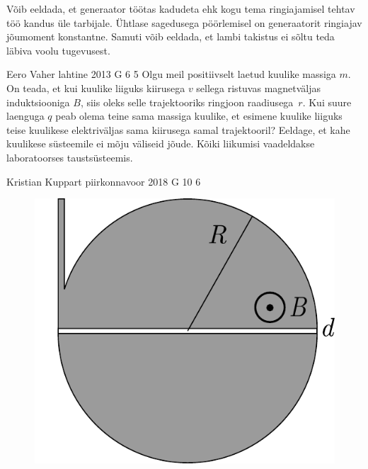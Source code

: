 \documentclass[11pt]{article}
\begin{document}
{{Võib eeldada, et generaator töötas kadudeta ehk kogu tema ringiajamisel tehtav
töö kandus üle tarbijale. Ühtlase sagedusega pöörlemisel on generaatorit
ringiajav jõumoment konstantne. Samuti võib eeldada, et lambi takistus ei sõltu
teda läbiva voolu tugevusest.
\fi
}

{Eero Vaher} %
{lahtine} %
{2013} %
{G 6} %
{5} %
{
\ifStatement
Olgu meil positiivselt laetud kuulike massiga $m$. On teada, et kui kuulike
liiguks kiirusega $v$ sellega ristuvas magnetväljas induktsiooniga $B$,
siis oleks selle trajektooriks ringjoon raadiusega~$r$. Kui suure laenguga $q$ peab olema teine sama massiga kuulike, et esimene
kuulike liiguks teise kuulikese elektriväljas sama kiirusega samal trajektooril? Eeldage, et
kahe kuulikese süsteemile ei mõju väliseid jõude. Kõiki liikumisi vaadeldakse
laboratoorses taustsüsteemis.
\pagebreak
\fi
}

{Kristian Kuppart} %
{piirkonnavoor} %
{2018} %
{G 10} %
{6} %
{
\ifStatement
\begin{figure}
	\begin{center}
		\includegraphics[width=\linewidth]{2018-v2g-10-tsyklotron}
	\end{center}
\end{figure}

}}
\end{document}
